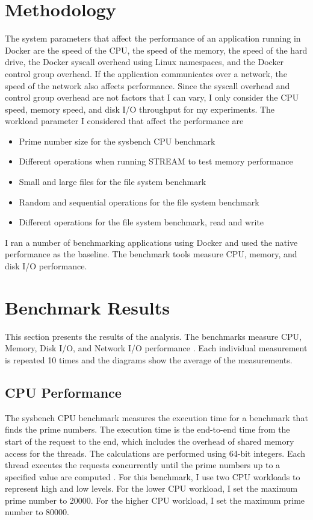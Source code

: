 \documentclass[11pt]{article}
\begin{document}
\section{Methodology}
The system parameters that affect the performance of an application running in Docker are the speed of the CPU, the speed of the memory, the speed of the hard drive, the Docker syscall overhead using Linux namespaces, and the Docker control group overhead. If the application communicates over a network, the speed of the network also affects performance. Since the syscall overhead and control group overhead are not factors that I can vary, I only consider the CPU speed, memory speed, and disk I/O throughput for my experiments. The workload parameter I considered that affect the performance are 
\begin{itemize}
\item Prime number size for the sysbench CPU benchmark
\item Different operations when running STREAM to test memory performance
\item Small and large files for the file system benchmark
\item Random and sequential operations for the file system benchmark
\item Different operations for the file system benchmark, read and write
\end{itemize}
I ran a number of benchmarking applications using Docker and used the native performance as the baseline. The benchmark tools measure CPU, memory, and disk I/O performance. 

\section{Benchmark Results}
This section presents the results of the analysis. The benchmarks measure CPU, Memory, Disk I/O, and Network I/O performance \cite{bukh}. Each individual measurement is repeated 10 
times and the diagrams show the average of the measurements. 

\subsection{CPU Performance}
The sysbench CPU benchmark measures the execution time for a benchmark that finds the prime numbers. The execution time is the end-to-end time from the start of the request to the end, which includes the overhead of shared memory access for the threads. The calculations are performed using 64-bit integers. Each thread executes the requests concurrently until the prime numbers up to a specified value are computed \cite{kopytov}. For this benchmark, I use two CPU workloads to represent high and low levels. For the lower CPU workload, I set the maximum prime number to 20000. For the higher CPU workload, I set the maximum prime number to 80000. 
\end{document}
